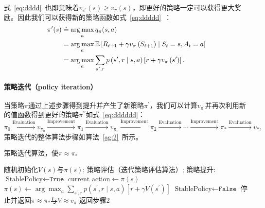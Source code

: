 式~\eqref{eq:dddd}~也即意味着$v_{\pi^{\prime}}(s) \geq v_{\pi}(s)$，即更好的策略一定可以获得更大奖励。因此我们可以获得新的策略函数如式~\eqref{eq:ddddd}~：
\begin{equation}
  \begin{aligned}
  \pi^{\prime}(s) & \doteq \operatorname*{\arg\max}_a q_{\pi}(s, a) \\
  &=\operatorname*{\arg\max}_a \mathbb{E}\left[R_{t+1}+\gamma v_{\pi}\left(S_{t+1}\right) \mid S_{t}=s, A_{t}=a\right] \\
  &=\operatorname*{\arg\max}_a \sum_{s^{\prime}, r} p\left(s^{\prime}, r \mid s, a\right)\left[r+\gamma v_{\pi}\left(s^{\prime}\right)\right].
  \end{aligned}
  \label{eq:ddddd}
\end{equation}

\paragraph{策略迭代（policy iteration）}
当策略$\pi$通过上述步骤得到提升并产生了新策略$\pi^{\prime}$，我们可以计算$v_{\pi^{\prime}}$并再次利用新的值函数得到更好的策略$\pi^{\prime\prime}$如式~\eqref{eq:dddddd}：
\begin{equation}
  \pi_{0} \stackrel{\mathrm{Evaluation}}{\longrightarrow} v_{\pi_{0}} \stackrel{\mathrm{Improvement}}{\longrightarrow} \pi_{1} \stackrel{\mathrm{Evaluation}}{\longrightarrow} v_{\pi_{1}} \stackrel{\mathrm{Improvement}}{\longrightarrow} \pi_{2} \stackrel{\mathrm{Evaluation}}{\longrightarrow} \cdots \stackrel{\mathrm{Improvement}}{\longrightarrow} \pi_{*} \stackrel{\mathrm{Evaluation}}{\longrightarrow} v_{*},
  \label{eq:dddddd}
\end{equation}
策略迭代的整体算法步骤如算法~\ref{ag:2}~所示。
\begin{algorithm}[!t]
  \caption{策略迭代算法，使$\pi \approx \pi_{*} $}
  \begin{algorithmic}[1]
    \State 随机初始化$V(s)$与$\pi(s)$;
    \State 策略评估（迭代策略评估算法）;
    \State 策略提升:
    \State $\text{StablePolicy} \leftarrow \texttt{True}$
    \State $\text{current action}\leftarrow\pi(s)$
    \State $\pi(s) \leftarrow \arg \max _{a} \sum_{s^{\prime}, r} p\left(s^{\prime}, r \mid s, a\right)\left[r+\gamma V\left(s^{\prime}\right)\right]$
        \State $\text{StablePolicy} \leftarrow \texttt{False}$
    \EndIf
    \EndFor
    \State 停止并返回$\pi \approx \pi_{*} $与$V\approx v_{\pi} $
    \Else 
    \State 返回步骤2
    \EndIf
  \end{algorithmic}
  \label{ag:2}
\end{algorithm}
